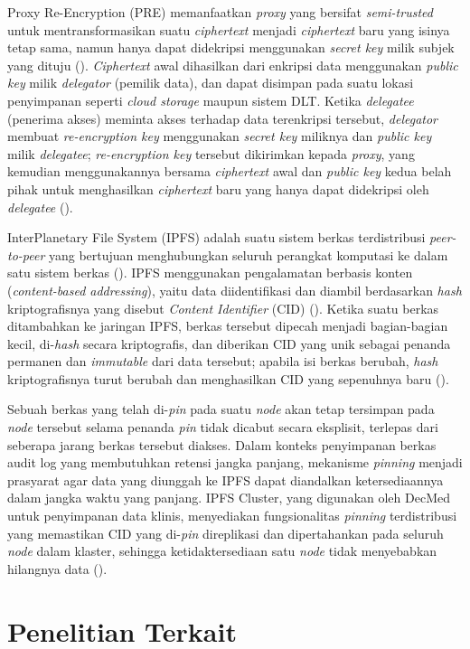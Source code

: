 Proxy Re-Encryption (PRE) memanfaatkan \textit{proxy} yang bersifat
\textit{semi-trusted} untuk mentransformasikan suatu \textit{ciphertext}
menjadi \textit{ciphertext} baru yang isinya tetap sama, namun hanya
dapat didekripsi menggunakan \textit{secret key} milik subjek yang
dituju (\cite{DecMed}). \textit{Ciphertext} awal dihasilkan dari
enkripsi data menggunakan \textit{public key} milik \textit{delegator}
(pemilik data), dan dapat disimpan pada suatu lokasi penyimpanan
seperti \textit{cloud storage} maupun sistem DLT. Ketika
\textit{delegatee} (penerima akses) meminta akses terhadap data
terenkripsi tersebut, \textit{delegator} membuat \textit{re-encryption
key} menggunakan \textit{secret key} miliknya dan \textit{public key}
milik \textit{delegatee}; \textit{re-encryption key} tersebut
dikirimkan kepada \textit{proxy}, yang kemudian menggunakannya bersama
\textit{ciphertext} awal dan \textit{public key} kedua belah pihak
untuk menghasilkan \textit{ciphertext} baru yang hanya dapat didekripsi
oleh \textit{delegatee} (\cite{DecMed}).

InterPlanetary File System (IPFS) adalah suatu sistem berkas
terdistribusi \textit{peer-to-peer} yang bertujuan menghubungkan
seluruh perangkat komputasi ke dalam satu sistem berkas
(\cite{benet2014ipfscontentaddressed}). IPFS menggunakan pengalamatan
berbasis konten (\textit{content-based addressing}), yaitu data
diidentifikasi dan diambil berdasarkan \textit{hash} kriptografisnya
yang disebut \textit{Content Identifier} (CID) (\cite{DecMed}).
Ketika suatu berkas ditambahkan ke jaringan IPFS, berkas tersebut
dipecah menjadi bagian-bagian kecil, di-\textit{hash} secara
kriptografis, dan diberikan CID yang unik sebagai penanda permanen dan
\textit{immutable} dari data tersebut; apabila isi berkas berubah,
\textit{hash} kriptografisnya turut berubah dan menghasilkan CID yang
sepenuhnya baru (\cite{DecMed}).

Sebuah berkas yang telah di-\textit{pin} pada suatu \textit{node} akan
tetap tersimpan pada \textit{node} tersebut selama penanda \textit{pin}
tidak dicabut secara eksplisit, terlepas dari seberapa jarang berkas
tersebut diakses. Dalam konteks penyimpanan berkas audit log yang
membutuhkan retensi jangka panjang, mekanisme \textit{pinning} menjadi
prasyarat agar data yang diunggah ke IPFS dapat diandalkan
ketersediaannya dalam jangka waktu yang panjang. IPFS Cluster, yang
digunakan oleh DecMed untuk penyimpanan data klinis, menyediakan
fungsionalitas \textit{pinning} terdistribusi yang memastikan CID yang
di-\textit{pin} direplikasi dan dipertahankan pada seluruh \textit{node}
dalam klaster, sehingga ketidaktersediaan satu \textit{node} tidak
menyebabkan hilangnya data (\cite{DecMed}).

\section{Penelitian Terkait}
\label{sec:penelitian-terkait}

